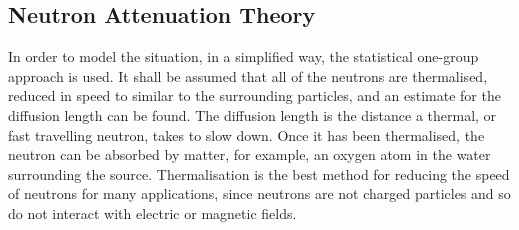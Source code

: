 \subsection{Neutron Attenuation Theory} %
\label{sub:neutron_attenuation_theory}
In order to model the situation, in a simplified way, the statistical one-group approach is used. It shall be assumed that all of the neutrons are thermalised, reduced in speed to similar to the surrounding particles, and an estimate for the diffusion length can be found. The diffusion length is the distance a thermal, or fast travelling neutron, takes to slow down. Once it has been thermalised, the neutron can be absorbed by matter, for example, an oxygen atom in the water surrounding the source. Thermalisation is the best method for reducing the speed of neutrons for many applications, since neutrons are not charged particles and so do not interact with electric or magnetic fields.

